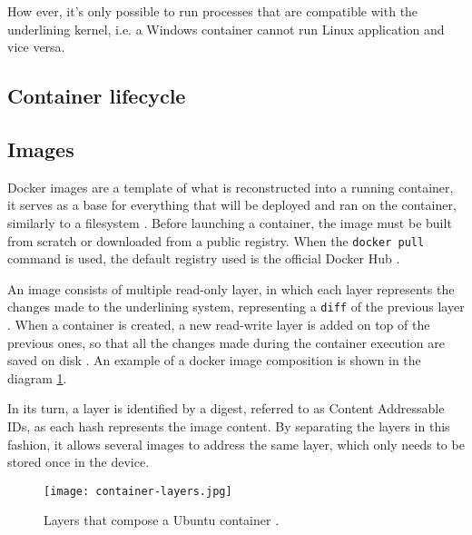 How ever, it's only possible to run processes that are compatible with the underlining kernel, i.e. a Windows container cannot run Linux application and vice versa.

\subsection{Container lifecycle}
\label{ssec::arch:contlife}


\subsection{Images}
\label{ssec::arch:images}
Docker images are a template of what is reconstructed into a running container, it serves as a base for everything that will be deployed and ran on the container, similarly to a filesystem \cite{Kane2018-fn}. Before launching a container, the image must be built from scratch or downloaded from a public registry. When the \texttt{docker pull} command is used, the default registry used is the official Docker Hub \cite{docker-hub}.

An image consists of multiple read-only layer, in which each layer represents the changes made to the underlining system, representing a \texttt{diff} of the previous layer \cite{images-layers}. When a container is created, a new read-write layer is added on top of the previous ones, so that all the changes made during the container execution are saved on disk \cite{fig-src:image-layers}. An example of a docker image composition is shown in the diagram \ref{fig::docker-image}.

In its turn, a layer is identified by a digest, referred to as Content Addressable IDs, as each hash represents the image content. By separating the layers in this fashion, it allows several images to address the same layer, which only needs to be stored once in the device.

\begin{figure}[!htb]
    \centering
    \texttt{[image: container-layers.jpg]}
    \caption{Layers that compose a Ubuntu container \cite{fig-src:image-layers}.}
    \label{fig::docker-image}
\end{figure}

